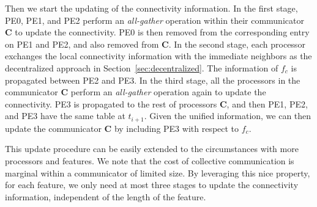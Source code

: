 Then we start the updating of the connectivity information. In the first stage, PE0, PE1, and PE2 perform an \emph{all-gather} operation within their communicator $\textbf{C}$ to update the connectivity. PE0 is then removed from the corresponding entry on PE1 and PE2, and also removed from $\textbf{C}$. In the second stage, each processor exchanges the local connectivity information with the immediate neighbors as the decentralized approach in Section~\ref{sec:decentralized}. The information of $f_c$ is propagated between PE2 and PE3. In the third stage, all the processors in the communicator $\textbf{C}$ perform an \emph{all-gather} operation again to update the connectivity. PE3 is propagated to the rest of processors $\textbf{C}$, and then PE1, PE2, and PE3 have the same table at $t_{i+1}$. Given the unified information, we can then update the communicator $\textbf{C}$ by including PE3 with respect to $f_c$.

This update procedure can be easily extended to the circumstances with more processors and features. We note that the cost of collective communication is marginal within a communicator of limited size. By leveraging this nice property, for each feature, we only need at most three stages to update the connectivity information, independent of the length of the feature.



